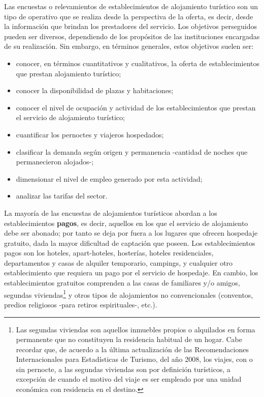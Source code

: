 \documentclass[
]{book}
\begin{document}
Las encuestas o relevamientos de establecimientos de alojamiento turístico son un tipo de operativo que se realiza desde la perspectiva de la oferta, es decir, desde la información que brindan los prestadores del servicio. Los objetivos perseguidos pueden ser diversos, dependiendo de los propósitos de las instituciones encargadas de su realización. Sin embargo, en términos generales, estos objetivos suelen ser:

\begin{itemize}
\item
  conocer, en términos cuantitativos y cualitativos, la oferta de establecimientos que prestan alojamiento turístico;
\item
  conocer la disponibilidad de plazas y habitaciones;
\item
  conocer el nivel de ocupación y actividad de los establecimientos que prestan el servicio de alojamiento turístico;
\item
  cuantificar los pernoctes y viajeros hospedados;
\item
  clasificar la demanda según origen y permanencia -cantidad de noches que permanecieron alojados-;
\item
  dimensionar el nivel de empleo generado por esta actividad;
\item
  analizar las tarifas del sector.
\end{itemize}

La mayoría de las encuestas de alojamientos turísticos abordan a los establecimientos \textbf{pagos}, es decir, aquellos en los que el servicio de alojamiento debe ser abonado; por tanto se deja por fuera a los lugares que ofrecen hospedaje gratuito, dada la mayor dificultad de captación que poseen. Los establecimientos pagos son los hoteles, apart-hoteles, hosterías, hoteles residenciales, departamentos y casas de alquiler temporario, campings, y cualquier otro establecimiento que requiera un pago por el servicio de hospedaje. En cambio, los establecimientos gratuitos comprenden a las casas de familiares y/o amigos, segundas viviendas\footnote{Las segundas viviendas son aquellos inmuebles propios o alquilados en forma permanente que no constituyen la residencia habitual de un hogar. Cabe recordar que, de acuerdo a la última actualización de las Recomendaciones Internacionales para Estadísticas de Turismo, del año 2008, los viajes, con o sin pernocte, a las segundas viviendas son por definición turísticos, a excepción de cuando el motivo del viaje es ser empleado por una unidad económica con residencia en el destino.} y otros tipos de alojamientos no convencionales (conventos, predios religiosos -para retiros espirituales-, etc.).
\end{document}
